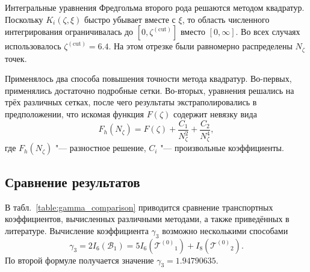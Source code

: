 \documentclass[a4paper,12pt]{article}
\newcommand{\T}[1][0]{\ensuremath{\mathcal{T}^{(#1)}}}
\begin{document}
Интегральные уравнения Фредгольма второго рода решаются методом квадратур.
Поскольку \(K_i(\zeta,\xi)\) быстро убывает вместе с \(\xi\),
то область численного интегрирования ограничивалась до \([0,\zeta^{(\mathrm{cut})}]\) вместо \([0,\infty]\).
Во всех случаях использовалось \(\zeta^{(\mathrm{cut})} = 6.4\).
На этом отрезке были равномерно распределены \(N_\zeta\) точек.

Применялось два способа повышения точности метода квадратур.
Во-первых, применялись достаточно подробные сетки.
Во-вторых, уравнения решались на трёх различных сетках, после чего результаты экстраполировались
в предположении, что искомая функция \(F(\zeta)\) содержит невязку вида
\begin{equation}
    F_h(N_\zeta) = F(\zeta) + \frac{C_1}{N_\zeta^2} + \frac{C_2}{N_\zeta^4},
\end{equation}
где \(F_h(N_\zeta)\) "--- разностное решение, \(C_i\) "--- произвольные коэффициенты.

\subsection{Сравнение результатов}

В табл.~\ref{table:gamma_comparison} приводится сравнение транспортных коэффициентов,
вычисленных различными методами, а также приведённых в литературе.
Вычисление коэффициента \(\gamma_3\) возможно несколькими способами
\begin{equation}
    \gamma_3 = 2I_6(\mathcal{B}_1) = 5I_6\left(\T_1\right) + I_8\left(\T_2\right).
\end{equation}
По второй формуле получается значение \(\gamma_3 = 1.94790635\).  
\end{document}
